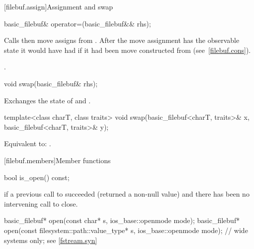 [filebuf.assign]{Assignment and swap}

%
\begin{itemdecl}
basic_filebuf& operator=(basic_filebuf&& rhs);
\end{itemdecl}

\begin{itemdescr}
\pnum
\effects
Calls  then move assigns from . After the
move assignment  has the observable state it would have had if it
had been move constructed from  (see~\ref{filebuf.cons}).

\pnum
\returns
{}.
\end{itemdescr}

%
\begin{itemdecl}
void swap(basic_filebuf& rhs);
\end{itemdecl}

\begin{itemdescr}
\pnum
\effects
Exchanges the state of 
and .
\end{itemdescr}

%
\begin{itemdecl}
template<class charT, class traits>
  void swap(basic_filebuf<charT, traits>& x,
            basic_filebuf<charT, traits>& y);
\end{itemdecl}

\begin{itemdescr}
\pnum
\effects
Equivalent to: .
\end{itemdescr}

[filebuf.members]{Member functions}

%
\begin{itemdecl}
bool is_open() const;
\end{itemdecl}

\begin{itemdescr}
\pnum
\returns
{}
if a previous call to
succeeded (returned a non-null value) and there has been no intervening
call to close.
\end{itemdescr}

%
\begin{itemdecl}
basic_filebuf* open(const char* s, ios_base::openmode mode);
basic_filebuf* open(const filesystem::path::value_type* s,
                    ios_base::openmode mode);  // wide systems only; see \ref{fstream.syn}
\end{itemdecl}

